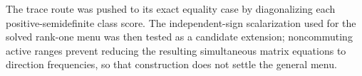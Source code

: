 The trace route was pushed to its exact equality case by diagonalizing each positive-semidefinite class score. The independent-sign scalarization used for the solved rank-one menu was then tested as a candidate extension; noncommuting active ranges prevent reducing the resulting simultaneous matrix equations to direction frequencies, so that construction does not settle the general menu.